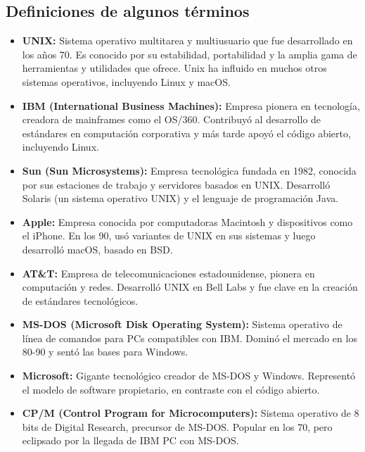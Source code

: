 \documentclass[a4paper,12pt]{article}
\begin{document}
\subsection*{Definiciones de algunos términos} 

\begin{itemize}
    \item \textbf{UNIX:} Sistema operativo multitarea y multiusuario que fue
    desarrollado en los años 70. Es conocido por su estabilidad, portabilidad y
    la amplia gama de herramientas y utilidades que ofrece. Unix ha influido en
    muchos otros sistemas operativos, incluyendo Linux y macOS.
    \label{unix}

    \item \textbf{IBM (International Business Machines):} Empresa pionera en tecnología, creadora de mainframes como el OS/360. Contribuyó al desarrollo de estándares en computación corporativa y más tarde apoyó el código abierto, incluyendo Linux.
    \label{ibm}

    \item \textbf{Sun (Sun Microsystems):} Empresa tecnológica fundada en 1982, conocida por sus estaciones de trabajo y servidores basados en UNIX. Desarrolló Solaris (un sistema operativo UNIX) y el lenguaje de programación Java.
    \label{sun}

    \item \textbf{Apple:} Empresa conocida por computadoras Macintosh y dispositivos como el iPhone. En los 90, usó variantes de UNIX en sus sistemas y luego desarrolló macOS, basado en BSD.
    \label{apple}

    \item \textbf{AT\&T:} Empresa de telecomunicaciones estadounidense, pionera en computación y redes. Desarrolló UNIX en Bell Labs y fue clave en la creación de estándares tecnológicos.
    \label{att}

    \item \textbf{MS-DOS (Microsoft Disk Operating System):} Sistema operativo de línea de comandos para PCs compatibles con IBM. Dominó el mercado en los 80-90 y sentó las bases para Windows.
    \label{msdos}

    \item \textbf{Microsoft:} Gigante tecnológico creador de MS-DOS y Windows. Representó el modelo de software propietario, en contraste con el código abierto.
    \label{microsoft}

    \item \textbf{CP/M (Control Program for Microcomputers):} Sistema operativo de 8 bits de Digital Research, precursor de MS-DOS. Popular en los 70, pero eclipsado por la llegada de IBM PC con MS-DOS.
    \label{cpm}


\end{itemize}
\end{document}
